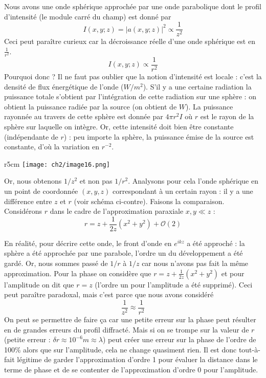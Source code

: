 Nous avons une onde sphérique approchée par une onde parabolique dont le profil d'intensité 
(le module carré du champ) est donné par
\begin{equation}
I(x,y;z) = |a(x,y;z)|^2 \propto \dfrac{1}{z^2}
\end{equation}
Ceci peut paraître curieux car la décroissance réelle d'une onde sphérique est en $\frac{1}{r^2}$.
\begin{equation}
I(x,y;z) \propto \frac{1}{r^2}
\end{equation}
Pourquoi donc ? Il ne faut pas oublier que la notion d'intensité est locale : c'est la 
densité de flux énergétique de l'onde ($W/m^2$). S'il y a une certaine radiation la puissance 
totale s'obtient par l'intégration de cette radiation sur une sphère : on obtient la 
puissance radiée par la source (on obtient de $W$). La puissance rayonnée au travers de cette 
sphère est donnée par $4\pi r^2 I$ où $r$ est le rayon de la sphère sur laquelle on intègre. 
Or, cette intensité doit bien être constante (indépendante de $r$) : peu importe la sphère, 
la puissance émise de la source est constante, d'où la variation en $r^{-2}$.\\

\begin{wrapfigure}[9]{r}{5cm}
\vspace{-5mm}
\texttt{[image: ch2/image16.png]}
\end{wrapfigure}
Or, nous obtenons $1/z^2$ et non pas $1/r^2$. Analysons pour cela l'onde sphérique en un 
point de coordonnée $(x,y,z)$ correspondant à un certain rayon : il y a une différence 
entre $z$ et $r$ (voir schéma ci-contre). Faisons la comparaison. Considérons $r$ dans le 
cadre de l'approximation paraxiale $x,y \ll z$ :
\begin{equation}
r = z+\frac{1}{2z}(x^2+y^2) + \mathcal{O}(2)
\end{equation}



En réalité, pour décrire cette onde, le front d'onde en $e^{ikz}$ a été approché : la 
sphère a été approchée par une parabole, l'ordre un du développement a été gardé. Or, nous 
sommes passé de $1/r$ à $1/z$ car nous n'avons pas fait la même 
approximation. Pour la phase on considère que $r = z +\frac{1}{2z}(x^2+y^2)$ et pour l'amplitude 
on dit que $r=z$ (l'ordre un pour l'amplitude a été supprimé). Ceci peut paraître paradoxal, 
mais c'est parce que nous avons considéré 
\begin{equation}
\frac{1}{z^2}\approx\frac{1}{r^2}
\end{equation}
On peut se permettre de faire ça car une petite erreur sur la phase peut résulter en de 
grandes erreurs du profil diffracté. Mais si on se trompe sur la valeur de $r$ (petite 
erreur : $\delta r \approx 10^{-6}m\approx \lambda$) peut créer une erreur sur la phase 
de l'ordre de 100\% alors que sur l'amplitude, cela ne change quasiment rien. Il est donc 
tout-à-fait légitime de garder l'approximation d'ordre 1 pour évaluer la distance dans le 
terme de phase et de se contenter de l'approximation d'ordre 0 pour l'amplitude.



